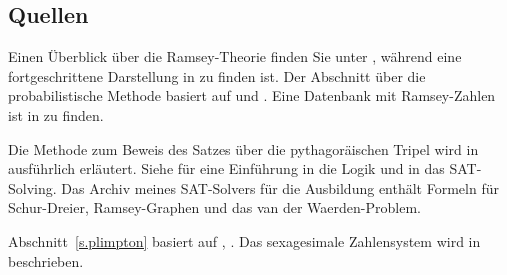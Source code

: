 \subsection*{Quellen}

Einen Überblick über die Ramsey-Theorie finden Sie unter \cite{burton}, während eine fortgeschrittene Darstellung in \cite{rudiments} zu finden ist. Der Abschnitt über die probabilistische Methode basiert auf \cite[Example~4o]{ross} und \cite[Chapter~4]{burton}. Eine Datenbank mit Ramsey-Zahlen ist in \cite{mckay} zu finden.

Die Methode zum Beweis des Satzes über die pythagoräischen Tripel wird in \cite{brute} ausführlich erläutert. Siehe \cite{mlcs} für eine Einführung in die Logik und in das SAT-Solving. Das Archiv meines SAT-Solvers für die Ausbildung \cite{joss} enthält Formeln für Schur-Dreier, Ramsey-Graphen und das van der Waerden-Problem. 

Abschnitt~\ref{s.plimpton} basiert auf \cite{wiki:plimpton}, \cite{robson}. 
Das sexagesimale Zahlensystem wird in \cite{wiki:sexagesimal} beschrieben.

